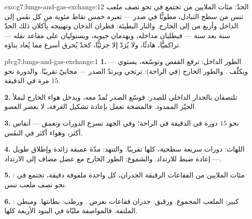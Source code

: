 \begin{solution}{exo:g7:lungs-and-gas-exchange:12}
الحدّ: مئات الملايين من  تجتمع في نحو نصف ملعب تنس من سطح
التبادل، مطويًّا في صدر --- تعبره خمس نقاط مئوية من  كل نفَس
إلى الداخل وأربع من  إلى الخارج. والنار البطيئة:
قطران الدخان وتهييجه يأكلان ذلك الحدّ سنة بعد سنة --- فيطليان
مداخله، ويهدمان جيوبه، ويستوليان على مقاعد نقله --- تراكميًّا،
هادئًا، ولا يُرَدّ إلا جزئيًّا، كحدّ يُحرق أسرع مما يُعاد بناؤه.
\end{solution}

\begin{solution}{pb:g7:lungs-and-gas-exchange:1}
\textbf{1.} الطور الداخل:   ترفع القفص وتوسّعه،
 يستوي --- ويكلّف . والطور الخارج (في الراحة):
ترتخي  ويرتدّ الصدر  --- مجانيّ تقريبًا. والدورة
نحو $15$ مرة في الدقيقة.

\textbf{2.}  تلتصقان بالجدار الداخلي للصدر: فوسّع الصدر
تُمدّ  معه، ويدخل هواء الخارج ليملأ الحيّز الممدود. فالمضخة
تعمل بإعادة تشكيل الغرفة، لا بعصر العضو.

\textbf{3.} نحو $15$ دورة في الدقيقة في الراحة؛ وفي الجهد تسرع
الدورات \emph{وتعمق} --- أنفاس أكثر، وهواء أكثر في النفَس.

\textbf{4.} اللهاث: دورات سريعة سطحية، كلها  تقريبًا.
والتنهد: مدّة عميقة زائدة وإطلاق طويل --- إعادة ضبط للارتداد.
والشموع: الطور الخارج مع عضل مضاف إلى الارتداد.

\textbf{5.} : مئات الملايين من الفقاعات الرقيقة الجدران، كل
واحدة ملفوفة  دقيقة، تجتمع في نحو نصف ملعب تنس.

\textbf{6.} كبير: الملعب المجموع. ورقيق: جدران فقاعات بعرض .
ورطب: بطانتها. ومبطن :  الملتفة. فالمواصفة ملبّاة في
البنود الأربعة كلها.


\end{solution}
